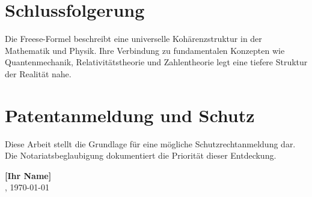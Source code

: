 \documentclass[a4paper,12pt]{article}
\begin{document}
\section{Schlussfolgerung}
Die Freese-Formel beschreibt eine universelle Kohärenzstruktur in der Mathematik und Physik. Ihre Verbindung zu fundamentalen Konzepten wie Quantenmechanik, Relativitätstheorie und Zahlentheorie legt eine tiefere Struktur der Realität nahe.

\section{Patentanmeldung und Schutz}
Diese Arbeit stellt die Grundlage für eine mögliche Schutzrechtanmeldung dar. Die Notariatsbeglaubigung dokumentiert die Priorität dieser Entdeckung.

\begin{flushright}
\textbf{[Ihr Name]} \\
[Ihr Wohnort], \today
\end{flushright}
\end{document}
